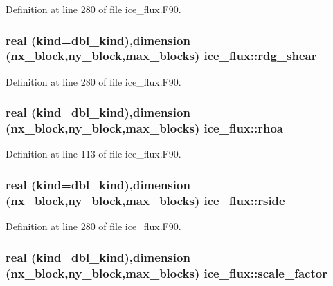 Definition at line 280 of file ice\_\-flux.F90.\hypertarget{namespaceice__flux_a4b3e399d9f8de85996ef9292690e425e}{
\subsubsection[{rdg\_\-shear}]{\setlength{\rightskip}{0pt plus 5cm}real (kind=dbl\_\-kind),dimension (nx\_\-block,ny\_\-block,max\_\-blocks) {\bf ice\_\-flux::rdg\_\-shear}}}
\label{namespaceice__flux_a4b3e399d9f8de85996ef9292690e425e}


Definition at line 280 of file ice\_\-flux.F90.\hypertarget{namespaceice__flux_ab8b07cf5accff1bc998fda8a9255f504}{
\subsubsection[{rhoa}]{\setlength{\rightskip}{0pt plus 5cm}real (kind=dbl\_\-kind),dimension (nx\_\-block,ny\_\-block,max\_\-blocks) {\bf ice\_\-flux::rhoa}}}
\label{namespaceice__flux_ab8b07cf5accff1bc998fda8a9255f504}


Definition at line 113 of file ice\_\-flux.F90.\hypertarget{namespaceice__flux_aaea76ee9c1cbdc7807e6de1b05378957}{
\subsubsection[{rside}]{\setlength{\rightskip}{0pt plus 5cm}real (kind=dbl\_\-kind),dimension (nx\_\-block,ny\_\-block,max\_\-blocks) {\bf ice\_\-flux::rside}}}
\label{namespaceice__flux_aaea76ee9c1cbdc7807e6de1b05378957}


Definition at line 280 of file ice\_\-flux.F90.\hypertarget{namespaceice__flux_af1c56f1d4d98b83318a54b61776ea37e}{
\subsubsection[{scale\_\-factor}]{\setlength{\rightskip}{0pt plus 5cm}real (kind=dbl\_\-kind),dimension (nx\_\-block,ny\_\-block,max\_\-blocks) {\bf ice\_\-flux::scale\_\-factor}}}
\label{namespaceice__flux_af1c56f1d4d98b83318a54b61776ea37e}


